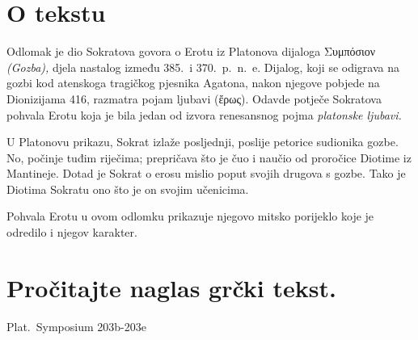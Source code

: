 


\section*{O tekstu}

Odlomak je dio Sokratova govora o Erotu iz Platonova dijaloga \textgreek[variant=ancient]{Συμπόσιον} \textit{(Gozba),} djela nastalog između 385.\ i 370.\ p.~n.~e. Dijalog, koji se odigrava na gozbi kod atenskoga tragičkog pjesnika Agatona, nakon njegove pobjede na Dionizijama 416, razmatra pojam ljubavi \textgreek[variant=ancient]{(ἔρως).} Odavde potječe Sokratova pohvala Erotu koja je bila jedan od izvora renesansnog pojma \textit{platonske ljubavi.}

U Platonovu prikazu, Sokrat izlaže posljednji, poslije petorice sudionika gozbe. No, počinje tuđim riječima; prepričava što je čuo i naučio od proročice Diotime iz Mantineje. Dotad je Sokrat o erosu mislio poput svojih drugova s gozbe. Tako je Diotima Sokratu ono što je on svojim učenicima.

Pohvala Erotu u ovom odlomku prikazuje njegovo mitsko porijeklo koje je odredilo i njegov karakter.



\section*{Pročitajte naglas grčki tekst.}

Plat.\ Symposium 203b-203e


\medskip



